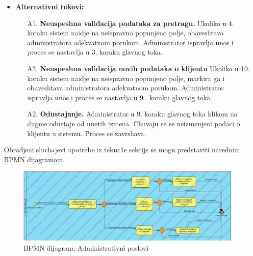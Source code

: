 \begin{itemize}
{}
\item{\textbf{Alternativni tokovi:} 
\begin{enumerate}
    \item [A1.] \textbf{Neuspeshna validacija podataka za pretragu.} Ukoliko u 4. koraku sistem naidje na neispravno popunjeno polje, obaveshtava administratora adekvatnom porukom. Administrator ispravlja unos i proces se nastavlja u 3. koraku glavnog toka.
    \item [A2.] \textbf{Neuspeshna validacija novih podataka o klijentu} Ukoliko u 10. koraku sistem naidje na neispravno popunjeno polje, markira ga i obaveshtava administratora adekvatnom porukom. Administrator ispravlja unos i proces se nastavlja u 9.. koraku glavnog toka.
    \item[A2.] \textbf{Odustajanje.} Administrator u 9. koraku glavnog toka klikom na dugme odustaje od unetih izmena. Chuvaju se se neizmenjeni podaci o klijentu u sistemu. Proces se zavrshava.
\end{enumerate}
}
\end{itemize}

Obradjeni sluchajevi upotrebe iz tekuc1e sekcije se mogu predstaviti narednim BPMN dijagramom.
\newpage

\begin{figure}[H]
    \includegraphics[angle = 90, scale = 0.35]{Slike/BPMN/BPMNadministrativniPoslovi.jpg}
    \centering
    \caption{BPMN dijagram: Administrativni poslovi}
\end{figure}  